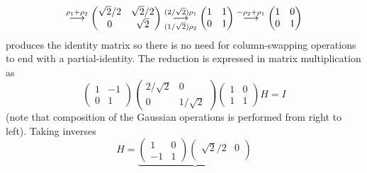 \begin{exercises}
\begin{answer}
\begin{exparts}
\begin{equation*}
            \grstep{\rho_1+\rho_2}
            \begin{pmatrix}
              \sqrt{2}/2  &\sqrt{2}/2  \\
              0           &\sqrt{2}
            \end{pmatrix}
            \grstep[(1/\sqrt{2})\rho_2]{(2/\sqrt{2})\rho_1}
            \begin{pmatrix}
              1  &1  \\
              0  &1
            \end{pmatrix}
            \grstep{-\rho_2+\rho_1}
            \begin{pmatrix}
              1  &0  \\
              0  &1
            \end{pmatrix}
          \end{equation*}
          produces the identity matrix 
          so there is no need for column-swapping operations
          to end with a partial-identity.
        \partsitem The reduction is expressed in matrix multiplication 
          as
          \begin{equation*}
            \begin{pmatrix}
              1  &-1 \\
              0  &1
            \end{pmatrix}
            \begin{pmatrix}
              2/\sqrt{2}  &0         \\
              0           &1/\sqrt{2}
            \end{pmatrix}
            \begin{pmatrix}
              1  &0 \\
              1  &1
            \end{pmatrix}
            H
            =I
          \end{equation*}
          (note that composition of the Gaussian operations is performed
          from right to left).
        \partsitem  Taking inverses 
          \begin{equation*}
            H
            =
            \underbrace{
              \begin{pmatrix}
                1  &0 \\
                -1  &1
              \end{pmatrix}
              \begin{pmatrix}
                \sqrt{2}/2  &0         \\

\end{pmatrix}}
\end{equation*}
\end{exparts}
\end{answer}
\end{exercises}
